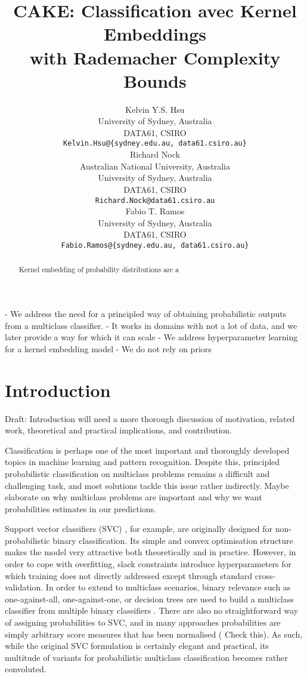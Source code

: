 \documentclass{article}
\title{CAKE: Classification avec Kernel Embeddings \\ with Rademacher Complexity Bounds}
\author{
	Kelvin Y.S. Hsu \\
	University of Sydney, Australia\\
	DATA61, CSIRO\\
	\texttt{Kelvin.Hsu@\{sydney.edu.au, data61.csiro.au\}} \\
	\And
	Richard Nock \\
	Australian National University, Australia\\
	University of Sydney, Australia\\
	DATA61, CSIRO\\
	\texttt{Richard.Nock@data61.csiro.au} \\
	\And
	Fabio T. Ramos \\
	University of Sydney, Australia\\
	DATA61, CSIRO\\
	\texttt{Fabio.Ramos@\{sydney.edu.au, data61.csiro.au\}} \\
}
\newcommand{\note}[1]{{\color{orange} #1}}
\begin{document}
\maketitle

\begin{abstract}
	Kernel embedding of probability distributions are a 
\end{abstract}

- We address the need for a principled way of obtaining probabilistic outputs from a multiclass classifier.
- It works in domains with not a lot of data, and we later provide a way for which it can scale
- We address hyperparameter learning for a kernel embedding model
- We do not rely on priors


\section{Introduction}
\label{sec:introduction}
	
	\note{Draft: Introduction will need a more thorough discussion of motivation, related work, theoretical and practical implications, and contribution.}
	
	Classification is perhaps one of the most important and thoroughly developed topics in machine learning and pattern recognition. Despite this, principled probabilistic classification on multiclass problems remains a difficult and challenging task, and most solutions tackle this issue rather indirectly. \note{Maybe elaborate on why multiclass problems are important and why we want probabilities estimates in our predictions.}
	
	Support vector classifiers (SVC) \citep{m2001introduction}, for example, are originally designed for non-probabilistic binary classification. Its simple and convex optimisation structure makes the model very attractive both theoretically and in practice. However, in order to cope with overfitting, slack constraints introduce hyperparameters for which training does not directly addressed except through standard cross-validation. In order to extend to multiclass scenarios, binary relevance such as one-against-all, one-against-one, or decision trees are used to build a multiclass classifier from multiple binary classifiers \citep{aly2005survey, hsu2002comparison}. There are also no straightforward way of assigning probabilities to SVC, and in many approaches probabilities are simply arbitrary score measures that has been normalised \citep{zadrozny2002transforming, franc2011support} (\note{Check this}). As such, while the original SVC formulation is certainly elegant and practical, its multitude of variants for probabilistic multiclass classification becomes rather convoluted.
	
\end{document}
